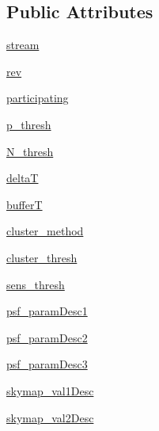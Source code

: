 \subsection*{Public Attributes}
\begin{DoxyCompactItemize}
\item 
\hyperlink{classamonpy_1_1dbase_1_1db__classes_1_1_alert_config2_a49f8af0cfc12e4f73da64323780102e8}{stream}
\item 
\hyperlink{classamonpy_1_1dbase_1_1db__classes_1_1_alert_config2_a44f00e5625906d6af0bda3a6f99f9c99}{rev}
\item 
\hyperlink{classamonpy_1_1dbase_1_1db__classes_1_1_alert_config2_a67a684e25c13f332b83baf748be6650d}{participating}
\item 
\hyperlink{classamonpy_1_1dbase_1_1db__classes_1_1_alert_config2_a8dbc3ae517192b47243d9cc10549c928}{p\-\_\-thresh}
\item 
\hyperlink{classamonpy_1_1dbase_1_1db__classes_1_1_alert_config2_aa4e9d2584bdecbd5b2c7be15784c7684}{N\-\_\-thresh}
\item 
\hyperlink{classamonpy_1_1dbase_1_1db__classes_1_1_alert_config2_ade495f929c328029a7a561b6a51e5914}{delta\-T}
\item 
\hyperlink{classamonpy_1_1dbase_1_1db__classes_1_1_alert_config2_a97fd6428426e51da12b281cf20dece5c}{buffer\-T}
\item 
\hyperlink{classamonpy_1_1dbase_1_1db__classes_1_1_alert_config2_a0467c2f3baa9c104d855b80898f8342f}{cluster\-\_\-method}
\item 
\hyperlink{classamonpy_1_1dbase_1_1db__classes_1_1_alert_config2_a32978aa8bf3558945e9e362ad55ed644}{cluster\-\_\-thresh}
\item 
\hyperlink{classamonpy_1_1dbase_1_1db__classes_1_1_alert_config2_acf76b84f2e496115285d95ccf2d60c22}{sens\-\_\-thresh}
\item 
\hyperlink{classamonpy_1_1dbase_1_1db__classes_1_1_alert_config2_af6d4d813406bf61fab7cd1d2de01766e}{psf\-\_\-param\-Desc1}
\item 
\hyperlink{classamonpy_1_1dbase_1_1db__classes_1_1_alert_config2_a8d604b6d92c7d6d1aa5d5a71e87c2f81}{psf\-\_\-param\-Desc2}
\item 
\hyperlink{classamonpy_1_1dbase_1_1db__classes_1_1_alert_config2_ab6fedbe0c3c5ddec221dd40f2118c3da}{psf\-\_\-param\-Desc3}
\item 
\hyperlink{classamonpy_1_1dbase_1_1db__classes_1_1_alert_config2_a3f204082c6db7abec1c48e3599a5fe0b}{skymap\-\_\-val1\-Desc}
\item 
\hyperlink{classamonpy_1_1dbase_1_1db__classes_1_1_alert_config2_ab819dfd55a24c72966efc393ecb82261}{skymap\-\_\-val2\-Desc}

\end{DoxyCompactItemize}
